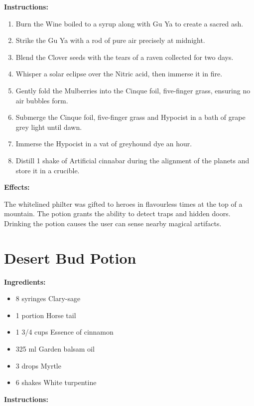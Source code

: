 \documentclass{article}
\begin{document}
\textbf{Instructions:}

\begin{enumerate}
  \item Burn the Wine boiled to a syrup along with Gu Ya to create a sacred ash.
  \item Strike the Gu Ya with a rod of pure air precisely at midnight.
  \item Blend the Clover seeds with the tears of a raven collected for two days.
  \item Whisper a solar eclipse over the Nitric acid, then immerse it in fire.
  \item Gently fold the Mulberries into the Cinque foil, five-finger grass, ensuring no air bubbles form.
  \item Submerge the Cinque foil, five-finger grass and Hypocist in a bath of grape grey light until dawn.
  \item Immerse the Hypocist in a vat of greyhound dye an hour.
  \item Distill 1 shake of Artificial cinnabar during the alignment of the planets and store it in a crucible.
\end{enumerate}

\textbf{Effects:}

The whitelined philter was gifted to heroes in flavourless times at the top of a mountain. The potion grants the ability to detect traps and hidden doors. Drinking the potion causes the user can sense nearby magical artifacts.

\newpage
\section*{Desert Bud Potion}

\textbf{Ingredients:}

\begin{itemize}
  \item 8 syringes Clary-sage
  \item 1 portion Horse tail
  \item 1 3/4 cups Essence of cinnamon
  \item 325 ml Garden balsam oil
  \item 3 drops Myrtle
  \item 6 shakes White turpentine
\end{itemize}

\textbf{Instructions:}
\end{document}
